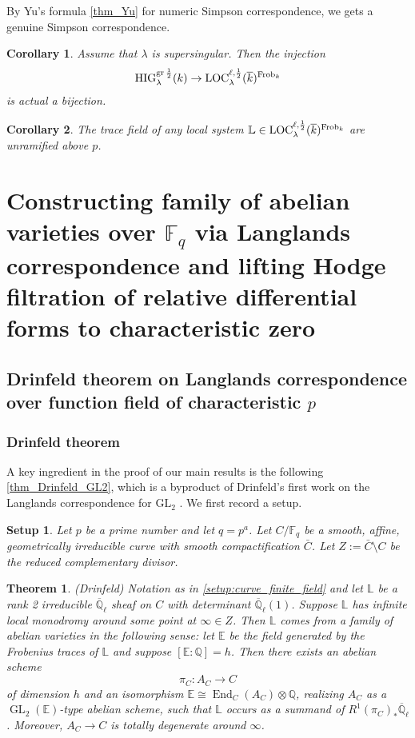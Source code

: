 \documentclass[12pt,twoside]{book}
\theoremstyle{plain}
\newtheorem{theorem}{Theorem}[section]
\newtheorem{setup}[setup]{Setup}
\newtheorem{corollary}[corollary]{Corollary}
\theoremstyle{definition}
\theoremstyle{remark}
\newcommand{\bL}{{\mathbb L}}
\newcommand{\bQ}{{\mathbb Q}}
\DeclareMathOperator\End{End}
\DeclareMathOperator\GL{GL}
\newcommand{\Fq}{{\mathbb{F}_q}}
\newcommand{\Qlbar}{{\overline{\mathbb{Q}}_{\ell}}}
\numberwithin{equation}{section}
\def\High{{\mathrm{HIG}^{{\rm gr}\,{1\over 2}}_{\lambda}}}
\def\Loch{{\mathrm{LOC}^{\ell,{1\over 2}}_{\lambda}}}
\def\Frob{\mathrm{Frob}}
\def\EK{{\mathbb E}}
\begin{document}
By Yu's formula \autoref{thm_Yu} for numeric Simpson correspondence, we gets a genuine Simpson correspondence.
\begin{corollary} \label{thm_genuineSimCorr}
Assume that $\lambda$ is supersingular. Then the injection
\[\High(k) \rightarrow \Loch(\overline{k})^{\Frob_{k}}\]
is actual a bijection.
\end{corollary}

\begin{corollary}
The trace field of any local system $\bL\in \Loch(\overline{k})^{\Frob_{k}}$ are unramified above $p$.
\end{corollary}

\newpage

\section{\bf Constructing family of abelian varieties over $\Fq$ via Langlands correspondence and lifting Hodge filtration of relative differential forms to characteristic zero} \label{sec_main_family_over_k}

\subsection{Drinfeld theorem on Langlands correspondence over function field of characteristic $p$}

\subsubsection{Drinfeld theorem}

A key ingredient in the proof of our main results is the following \autoref{thm_Drinfeld_GL2}, which is a byproduct of Drinfeld's first work on the Langlands correspondence for $\mathrm{GL}_2$ \cite{Dri77}. We first record a setup.
\begin{setup}\label{setup:curve_finite_field}
Let $p$ be a prime number and let $q=p^a$. Let $C/\Fq$ be a smooth, affine, geometrically irreducible curve with smooth compactification $\bar{C}$. Let $Z:=\bar{C}\setminus C$ be the reduced complementary divisor.
\end{setup}

\begin{theorem}\label{thm_Drinfeld_GL2}(Drinfeld) Notation as in \autoref{setup:curve_finite_field} and let $\bL$ be a rank 2 irreducible $\Qlbar$ sheaf on $C$ with determinant $\Qlbar(1)$. Suppose $\bL$ has infinite local monodromy around some point at $\infty\in Z$. Then $\bL$ comes from a family of abelian varieties in the following sense: let $\EK$ be the field generated by the Frobenius traces of $\bL$ and suppose $[\EK:\bQ]=h$. Then there exists an abelian scheme
\[
\pi_C\colon A_{C}\rightarrow C
\]
of dimension $h$ and an isomorphism $\EK\cong \End_{C}(A_C)\otimes\bQ$, realizing $A_C$ as a $\GL_2(\EK)$-type abelian scheme, such that $\bL$ occurs as a summand of $R^1(\pi_C)_*\Qlbar$. Moreover, $A_{C}\rightarrow C$ is totally degenerate around $\infty$.
\end{theorem}
\end{document}
